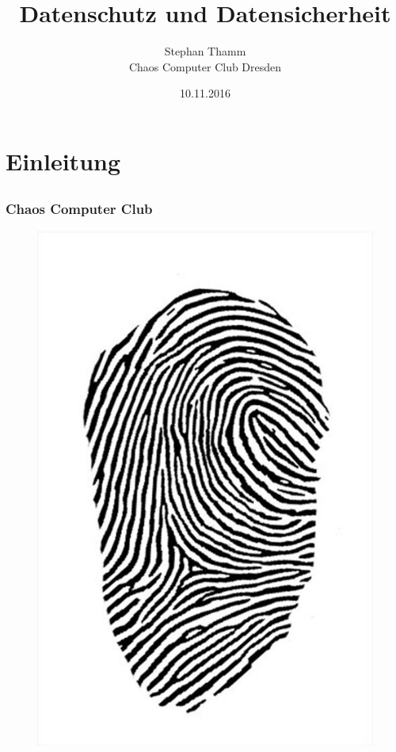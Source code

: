 \documentclass[12pt]{beamer}
\title{Datenschutz und Datensicherheit}
\author{\small Stephan Thamm\\\large Chaos Computer Club Dresden}
\date{10.11.2016}
\begin{document}
\maketitle

\section{Einleitung}
\subsection{}

\begin{frame}
  \frametitle{Chaos Computer Club}
  \begin{figure}
    \includegraphics[height=0.7\textheight]{img/fingerabdruck.jpg}
  \end{figure}
\end{frame}
\end{document}
